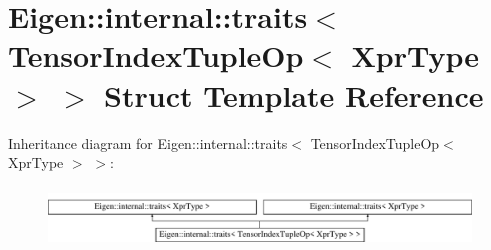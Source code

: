 \hypertarget{struct_eigen_1_1internal_1_1traits_3_01_tensor_index_tuple_op_3_01_xpr_type_01_4_01_4}{}\section{Eigen\+:\+:internal\+:\+:traits$<$ Tensor\+Index\+Tuple\+Op$<$ Xpr\+Type $>$ $>$ Struct Template Reference}
\label{struct_eigen_1_1internal_1_1traits_3_01_tensor_index_tuple_op_3_01_xpr_type_01_4_01_4}
Inheritance diagram for Eigen\+:\+:internal\+:\+:traits$<$ Tensor\+Index\+Tuple\+Op$<$ Xpr\+Type $>$ $>$\+:\begin{figure}[H]
\begin{center}
\leavevmode
\includegraphics[height=1.613833cm]{struct_eigen_1_1internal_1_1traits_3_01_tensor_index_tuple_op_3_01_xpr_type_01_4_01_4}
\end{center}
\end{figure}
